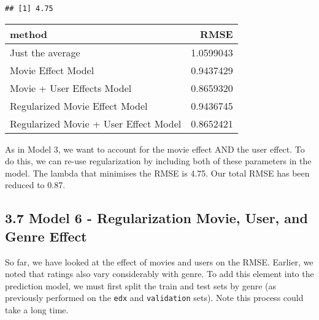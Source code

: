 \documentclass[]{article}
\newenvironment{Shaded}{\begin{snugshade}}{\end{snugshade}}
\newcommand{\DataTypeTok}[1]{\textcolor[rgb]{0.13,0.29,0.53}{#1}}
\newcommand{\KeywordTok}[1]{\textcolor[rgb]{0.13,0.29,0.53}{\textbf{#1}}}
\newcommand{\NormalTok}[1]{#1}
\newcommand{\OperatorTok}[1]{\textcolor[rgb]{0.81,0.36,0.00}{\textbf{#1}}}
\newcommand{\StringTok}[1]{\textcolor[rgb]{0.31,0.60,0.02}{#1}}
\begin{document}
\begin{verbatim}
## [1] 4.75
\end{verbatim}

\begin{Shaded}
\end{Shaded}

\begin{longtable}[]{@{}lr@{}}
\toprule
method & RMSE\tabularnewline
\midrule
\endhead
Just the average & 1.0599043\tabularnewline
Movie Effect Model & 0.9437429\tabularnewline
Movie + User Effects Model & 0.8659320\tabularnewline
Regularized Movie Effect Model & 0.9436745\tabularnewline
Regularized Movie + User Effect Model & 0.8652421\tabularnewline
\bottomrule
\end{longtable}

As in Model 3, we want to account for the movie effect AND the user
effect. To do this, we can re-use regularization by including both of
these parameters in the model. The lambda that minimises the RMSE is
4.75. Our total RMSE has been reduced to 0.87.

\hypertarget{model-6---regularization-movie-user-and-genre-effect-1}{%
\subsection{3.7 Model 6 - Regularization Movie, User, and Genre
Effect}\label{model-6---regularization-movie-user-and-genre-effect-1}}

So far, we have looked at the effect of movies and users on the RMSE.
Earlier, we noted that ratings also vary considerably with genre. To add
this element into the prediction model, we must first split the train
and test sets by genre (as previously performed on the \texttt{edx} and
\texttt{validation} sets). Note this process could take a long time.
\end{document}

